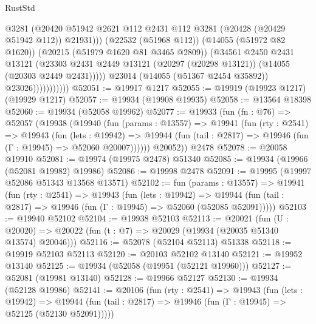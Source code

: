 \begin{lexlean}{RustStd}
\begin{coremodule}
                                @3281
                                (@20420
                                  @51942
                                  @2621
                                  @112
                                  @2431
                                  @112
                                  @3281
                                  (@20428 (@20429 @51942 @112))
                                  @21931)))
                            (@22532 (@51968 @112))
                            (@14055 (@51972 @82 @1620))
                            (@20215 (@51979 @1620 @81 @3465 @2809))
                            (@34561
                              @2450
                              @2431
                              @13121
                              (@23303
                                @2431
                                @2449
                                @13121
                                (@20297 (@20298 @13121))
                                (@14055 (@20303 @2449 @2431)))))
                          @23014
                          (@14055 (@51367 @2454 @35892))
                          @23026)))))))))))
@52051 := @19917 @1217
@52055 := @19919 (@19923 @1217) (@19929 @1217)
@52057 := @19934 (@19908 @19935)
@52058 := @13564 @18398
@52060 := @19934 (@52058 @19962)
@52077 := @19933
    (fun (fn : @76) =>
    @52057
      (@19938
        (@19940
          (fun (params : @13557) =>
          @19941
            (fun (rty : @2541) =>
            @19943
              (fun (lets : @19942) =>
              @19944 (fun (tail : @2817) => @19946 (fun (Γ : @19945) => @52060 @20007))))))
        @20052))
    @2478
@52078 := @20058 @19910
@52081 := @19974 (@19975 @2478) @51340
@52085 := @19934 (@19966 (@52081 @19982) @19986)
@52086 := @19998 @2478
@52091 := @19995 (@19997 @52086 @51343 @13568 @13571)
@52102 := fun (params : @13557) =>
  @19941
    (fun (rty : @2541) =>
    @19943
      (fun (lets : @19942) =>
      @19944 (fun (tail : @2817) => @19946 (fun (Γ : @19945) => @52060 (@52085 @52091)))))
@52103 := @19940 @52102
@52104 := @19938 @52103
@52113 := @20021
    (fun (U : @20020) => @20022 (fun (t : @7) => @20029 (@19934 (@20035 @51340 @13574) @20046)))
@52116 := @52078 (@52104 @52113) @51338
@52118 := @19919 @52103 @52113
@52120 := @20103 @52102 @13140
@52121 := @19952 @13140
@52125 := @19934 (@52058 (@19951 (@52121 @19960)))
@52127 := @52081 (@19981 @13140)
@52128 := @19966 @52127
@52130 := @19934 (@52128 @19986)
@52141 := @20106
    (fun (rty : @2541) =>
    @19943
      (fun (lets : @19942) =>
      @19944 (fun (tail : @2817) => @19946 (fun (Γ : @19945) => @52125 (@52130 @52091)))))

\end{coremodule}
\end{lexlean}
